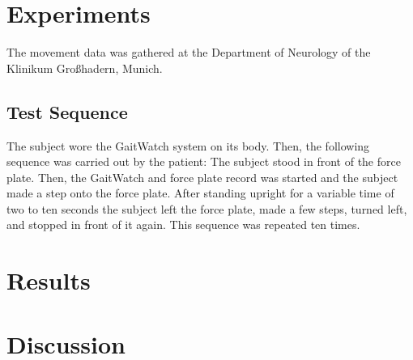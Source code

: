 \section{Experiments}

The movement data was gathered at the Department of Neurology of the Klinikum Großhadern, Munich.

\subsection{Test Sequence}

The subject wore the GaitWatch system on its body. Then, the following sequence was carried out by the patient: The subject stood in front of the force plate. Then, the GaitWatch and force plate record was started and the subject made a step onto the force plate. After standing upright for a variable time of two to ten seconds the subject left the force plate, made a few steps, turned left, and stopped in front of it again. This sequence was repeated ten times.

\section{Results}

\section{Discussion}

